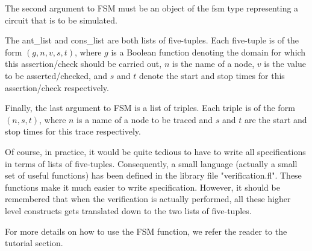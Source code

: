 The second argument to FSM must be an object of the fsm type representing
a circuit that is to be simulated.

The ant\_list and cons\_list are  both lists of five-tuples.
Each five-tuple is of the form $(g,n,v,s,t)$, where $g$ is a Boolean function
denoting the domain for which this assertion/check should be carried out,
$n$ is the name of a node, $v$ is the value to be asserted/checked, and
$s$ and $t$ denote the start and stop times for this assertion/check
respectively.

Finally, the last argument to FSM is a list of triples.
Each triple is of the form $(n,s,t)$, where $n$ is a name of a node
to be traced and $s$ and $t$ are the start and stop times for this
trace respectively.

Of course, in practice, it would be quite tedious to have to
write all specifications in terms of lists of five-tuples.
Consequently, a small language (actually a small set of useful functions)
has been defined in the library file "verification.fl".
These functions make it much easier to write specification.
However, it should be remembered that when the verification
is actually performed, all these higher level constructs gets translated
down to the two lists of five-tuples.

For more details on how to use the FSM function, we refer the reader to the
tutorial section.

